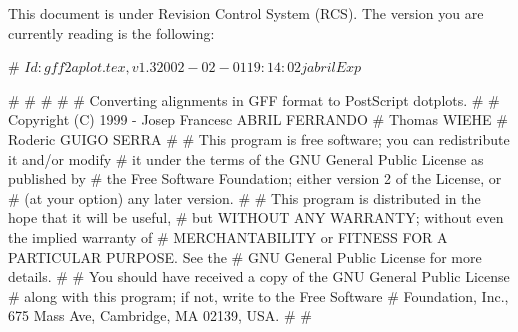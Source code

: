 \documentclass[11pt]{article}
\def\nwendcode{\endtrivlist \endgroup} %
\let\nwdocspar=\par                    %
\begin{document}

This document is under Revision Control System (RCS). The version you are currently reading is the following:

\nwenddocs{}\endmoddef
# $Id: gff2aplot.tex,v 1.3 2002-02-01 19:14:02 jabril Exp $
\nwendcode{}\nwdocspar


\nwenddocs{}\endmoddef
# %
# %
# %
# 
#    Converting alignments in GFF format to PostScript dotplots.
# 
#     Copyright (C) 1999 - Josep Francesc ABRIL FERRANDO  
#                                  Thomas WIEHE                   
#                                 Roderic GUIGO SERRA       
#
# This program is free software; you can redistribute it and/or modify
# it under the terms of the GNU General Public License as published by
# the Free Software Foundation; either version 2 of the License, or
# (at your option) any later version.
# 
# This program is distributed in the hope that it will be useful,
# but WITHOUT ANY WARRANTY; without even the implied warranty of
# MERCHANTABILITY or FITNESS FOR A PARTICULAR PURPOSE.  See the
# GNU General Public License for more details.
# 
# You should have received a copy of the GNU General Public License
# along with this program; if not, write to the Free Software
# Foundation, Inc., 675 Mass Ave, Cambridge, MA 02139, USA.
# 
# %
\nwendcode{}\nwdocspar
\end{document}
